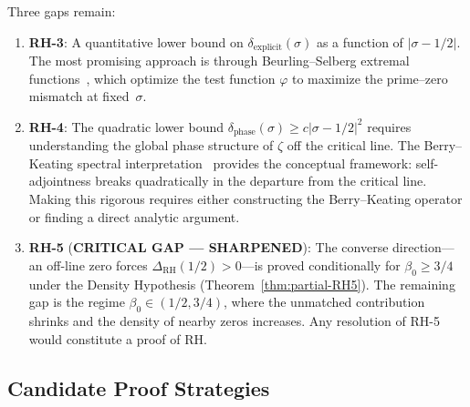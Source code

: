 \documentclass[11pt]{article}
\theoremstyle{remark}
\begin{document}
Three gaps remain:
\begin{enumerate}
  \item \textbf{RH-3}: A quantitative lower bound on
    $\delta_{\mathrm{explicit}}(\sigma)$ as a function of $|\sigma-1/2|$.
    The most promising approach is through Beurling--Selberg extremal
    functions~\cite{IK}, which optimize the test function $\varphi$ to maximize the
    prime--zero mismatch at fixed~$\sigma$.

  \item \textbf{RH-4}: The quadratic lower bound
    $\delta_{\mathrm{phase}}(\sigma)\geq c|\sigma-1/2|^2$ requires understanding the
    global phase structure of $\zeta$ off the critical line.
    The Berry--Keating spectral interpretation~\cite{BK} provides the conceptual
    framework: self-adjointness breaks quadratically in the departure from the
    critical line.
    Making this rigorous requires either constructing the Berry--Keating operator or
    finding a direct analytic argument.

  \item \textbf{RH-5} (\textbf{CRITICAL GAP --- SHARPENED}): The converse direction---an
    off-line zero forces $\Delta_{\mathrm{RH}}(1/2)>0$---is proved conditionally
    for $\beta_0 \geq 3/4$ under the Density Hypothesis
    (Theorem~\ref{thm:partial-RH5}).  The remaining gap is the regime
    $\beta_0 \in (1/2, 3/4)$, where the unmatched contribution shrinks and
    the density of nearby zeros increases.
    Any resolution of RH-5 would constitute a proof of RH.
\end{enumerate}

\subsection{Candidate Proof Strategies}
\end{document}
